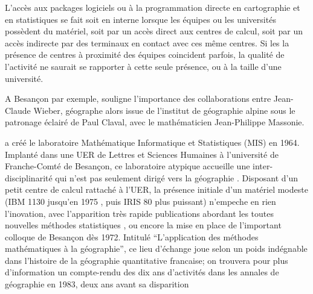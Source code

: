 




L’accès aux packages logiciels ou à la programmation directe en cartographie et en statistiques se fait soit en interne lorsque les équipes ou les universités possèdent du matériel, soit par un accès direct aux centres de calcul, soit par un accès indirecte par des terminaux en contact avec ces même centres. Si les la présence de centres à proximité des équipes coincident parfois, la qualité de l'activité ne saurait se rapporter à cette seule présence, ou à la taille d'une université. \autocites{Wieber1980}[448]{Joliveau2004}

A Besançon par exemple, \textcite[131]{Cuyala2014} souligne l’importance des collaborations entre Jean-Claude Wieber, géographe alors issue de l’institut de géographie alpine sous le patronage éclairé de Paul Claval, avec le mathématicien Jean-Philippe Massonie.

\textcite{Massonie1986} a créé le laboratoire Mathématique Informatique et Statistiques (MIS) en 1964. Implanté dans une UER de Lettres et Sciences Humaines à l’université de Franche-Comté de Besançon, ce laboratoire atypique accueille une inter-disciplinarité qui n'est pas seulement dirigé vers la géographie . Disposant d’un petit centre de calcul rattaché à l'UER, la présence initiale d'un matériel modeste (IBM 1130 jusqu'en 1975 \autocite[22]{Wieber1980}, puis IRIS 80 plus puissant) n'empeche en rien l'inovation, avec l'apparition très rapide publications abordant les toutes nouvelles méthodes statistiques \autocite{Massonie1971}, ou encore la mise en place de l'important colloque de Besançon dès 1972. Intitulé \enquote{L'application des méthodes mathématiques à la géographie}, ce lieu d'échange joue selon \autocite[331]{Cuyala2014} un poids indégnable dans l'histoire de la géographie quantitative francaise; on trouvera pour plus d'information un compte-rendu des dix ans d'activités dans les annales de géographie en 1983, deux ans avant sa disparition \autocite{Massonie1983}

